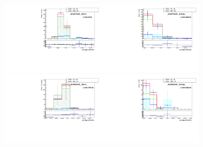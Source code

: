 \begin{figure}[htb]
  \begin{center}
   \includegraphics[width=0.45\textwidth]{../figs/figs_v11/ELECTRON_WGamma/TemplateFits/c_TEMPL_SIHIH_UNblind__phoEt75to85__Barrel__RooFit_MCclosure.pdf}\includegraphics[width=0.45\textwidth]{../figs/figs_v11/ELECTRON_WGamma/TemplateFits/c_TEMPL_SIHIH_UNblind__phoEt75to85__Endcap__RooFit_MCclosure.pdf}\\
   \includegraphics[width=0.45\textwidth]{../figs/figs_v11/ELECTRON_WGamma/TemplateFits/c_TEMPL_SIHIH_UNblind__phoEt85to95__Barrel__RooFit_MCclosure.pdf}\includegraphics[width=0.45\textwidth]{../figs/figs_v11/ELECTRON_WGamma/TemplateFits/c_TEMPL_SIHIH_UNblind__phoEt85to95__Endcap__RooFit_MCclosure.pdf}\\

\end{center}
\end{figure}
